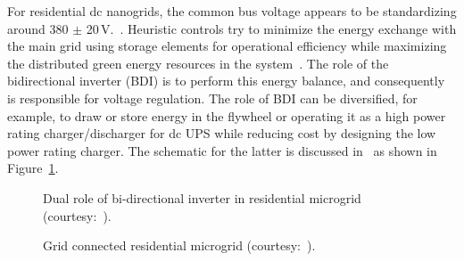 \documentclass[10pt]{IETBook}
\begin{document}
For residential dc nanogrids, the common bus voltage appears to be standardizing around 380 $\pm$ 20\,V.~\cite{laurens,taiwandemo}. Heuristic controls try to minimize the energy exchange with the main grid using storage elements for operational efficiency while maximizing the distributed green energy resources in the system~\cite{taiwandemo}. The role of the bidirectional inverter (BDI) is to perform this energy balance, and consequently is responsible for voltage regulation. The role of BDI can be diversified, for example, to draw or store energy in the flywheel or operating it as a high power rating charger/discharger for dc UPS while reducing cost by designing the low power rating charger. The schematic for the latter is discussed in~\cite{taiwandemo} as shown in Figure~\ref{figbdi}.
\begin{figure}[!h]
\centerline{}
\caption{Dual role of bi-directional inverter in residential microgrid (courtesy:~\cite{taiwandemo}).}
\label{figbdi}
\end{figure}

\begin{figure}[!h]
\centerline{}
\caption{Grid connected residential microgrid  (courtesy:~\cite{taiwandemo}).}
\label{figtaidemo}
\end{figure}
\end{document}
